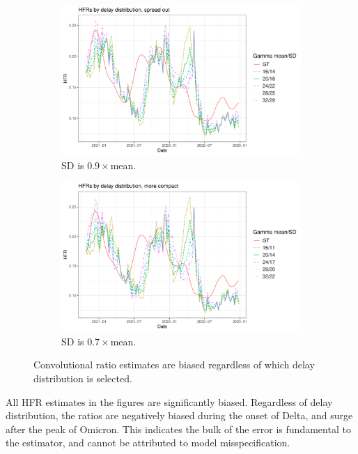 \documentclass{article}
\begin{document}
\begin{figure}
     \centering
     \begin{subfigure}[b]{0.45\linewidth}
         \centering
         \includegraphics[width=\linewidth]{Figures/Real/hfrs_by_delay1.pdf}
         \caption{SD is $0.9\times$mean.}
         \label{fig:delay1}
     \end{subfigure}
     \hfill
     \begin{subfigure}[b]{0.45\linewidth}
         \centering
         \includegraphics[width=\linewidth]{Figures/Real/hfrs_by_delay2.pdf}
         \caption{SD is $0.7\times$mean.}
         \label{fig:delay2}
     \end{subfigure}
        \caption{Convolutional ratio estimates are biased regardless of which delay distribution is selected.}
        \label{fig:delays}
\end{figure}
All HFR estimates in the figures are significantly biased. Regardless of delay distribution, the ratios are negatively biased during the onset of Delta, and surge after the peak of Omicron. This indicates the bulk of the error is fundamental to the estimator, and cannot be attributed to model misspecification. 
\end{document}
